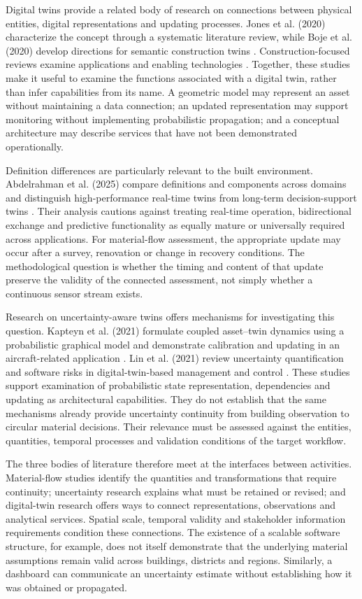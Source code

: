 Digital twins provide a related body of research on connections between physical entities, digital representations and updating processes. Jones et al. (2020) characterize the concept through a systematic literature review, while Boje et al. (2020) develop directions for semantic construction twins \citep{I27,I26}. Construction-focused reviews examine applications and enabling technologies \citep{I28,I29}. Together, these studies make it useful to examine the functions associated with a digital twin, rather than infer capabilities from its name. A geometric model may represent an asset without maintaining a data connection; an updated representation may support monitoring without implementing probabilistic propagation; and a conceptual architecture may describe services that have not been demonstrated operationally.

Definition differences are particularly relevant to the built environment. Abdelrahman et al. (2025) compare definitions and components across domains and distinguish high-performance real-time twins from long-term decision-support twins \citep{I31}. Their analysis cautions against treating real-time operation, bidirectional exchange and predictive functionality as equally mature or universally required across applications. For material-flow assessment, the appropriate update may occur after a survey, renovation or change in recovery conditions. The methodological question is whether the timing and content of that update preserve the validity of the connected assessment, not simply whether a continuous sensor stream exists.

Research on uncertainty-aware twins offers mechanisms for investigating this question. Kapteyn et al. (2021) formulate coupled asset--twin dynamics using a probabilistic graphical model and demonstrate calibration and updating in an aircraft-related application \citep{I33}. Lin et al. (2021) review uncertainty quantification and software risks in digital-twin-based management and control \citep{I32}. These studies support examination of probabilistic state representation, dependencies and updating as architectural capabilities. They do not establish that the same mechanisms already provide uncertainty continuity from building observation to circular material decisions. Their relevance must be assessed against the entities, quantities, temporal processes and validation conditions of the target workflow.

The three bodies of literature therefore meet at the interfaces between activities. Material-flow studies identify the quantities and transformations that require continuity; uncertainty research explains what must be retained or revised; and digital-twin research offers ways to connect representations, observations and analytical services. Spatial scale, temporal validity and stakeholder information requirements condition these connections. The existence of a scalable software structure, for example, does not itself demonstrate that the underlying material assumptions remain valid across buildings, districts and regions. Similarly, a dashboard can communicate an uncertainty estimate without establishing how it was obtained or propagated.

